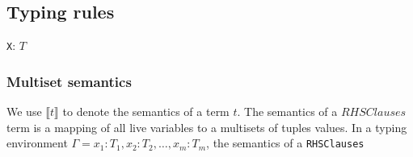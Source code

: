 \documentclass[10pt]{article}
\newcommand{\code}[1]{\texttt{#1}}
\begin{document}
\subsection{Typing rules}

\code{X}: $T$

\subsubsection{Multiset semantics}

We use $\llbracket t \rrbracket$ to denote the semantics of a term
$t$.  The semantics of a $\mathit{RHSClauses}$ term is a mapping of
all live variables to a multisets of tuples values.  In a typing
environment $\Gamma = x_1 : T_1, x_2 : T_2, \ldots, x_m : T_m$, the
semantics of a \code{RHSClauses}
\end{document}
